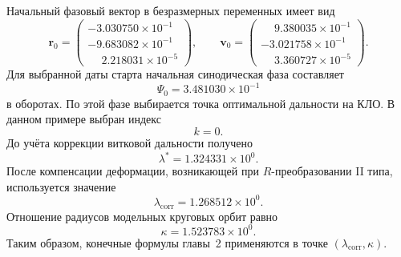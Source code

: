 Начальный фазовый вектор в безразмерных переменных имеет вид
\begin{equation}
\mathbf r_0=
\begin{pmatrix}
	-3.030750\times10^{-1}\\
	-9.683082\times10^{-1}\\
	\phantom{-}2.218031\times10^{-5}
\end{pmatrix},
\qquad
\mathbf v_0=
\begin{pmatrix}
	\phantom{-}9.380035\times10^{-1}\\
	-3.021758\times10^{-1}\\
	\phantom{-}3.360727\times10^{-5}
\end{pmatrix}.
\end{equation}
Для выбранной даты старта начальная синодическая фаза составляет
\begin{equation}
\Psi_0=3.481030\times10^{-1}
\end{equation}
в оборотах. По этой фазе выбирается точка оптимальной дальности на КЛО. В данном примере выбран индекс
\begin{equation}
k=0.
\end{equation}
До учёта коррекции витковой дальности получено
\begin{equation}
\lambda^*=1.324331\times10^{0}.
\end{equation}
После компенсации деформации, возникающей при \(R\)-преобразовании II типа, используется значение
\begin{equation}
\lambda_{\mathrm{corr}}=1.268512\times10^{0}.
\end{equation}
Отношение радиусов модельных круговых орбит равно
\begin{equation}
\kappa=1.523783\times10^{0}.
\end{equation}
Таким образом, конечные формулы главы~2 применяются в точке \((\lambda_{\mathrm{corr}},\kappa)\).

